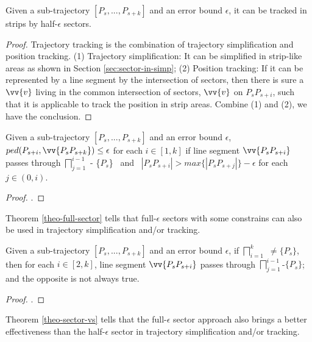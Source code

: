 \begin{theorem}
	\label{theo-half-sector}
	Given a sub-trajectory $[P_s,...,P_{s+k}]$ and an error bound $\epsilon$, it can be tracked in strips by half-$\epsilon$ sectors.
\end{theorem}

\begin{proof}
	Trajectory tracking is the combination of trajectory simplification and position tracking.
	(1) Trajectory simplification: It can be simplified in strip-like areas as shown in Section \ref{sec:sector-in-simp};
	(2) Position tracking: If it can be represented by a line segment by the intersection of sectors, then there is sure a $\vv{v}$ living in the common intersection of sectors, \eg $\vv{v}$ on $P_sP_{s+i}$, such that it is applicable to track the position in strip areas.
	Combine (1) and (2), we have the conclusion.
\end{proof}



\begin{theorem}
	\label{theo-full-sector}
	Given a sub-trajectory $[P_s,...,P_{s+k}]$ and an error bound $\epsilon$, $ped(P_{s+i}, \vv{P_sP_{s+k}})\le \epsilon$ for each $i \in [1,k]$ if line segment $\vv{P_sP_{s+i}}$ passes through $\bigsqcap_{j=1}^{i-1}$ - \{$P_s$\} ~and~ $|P_sP_{s+i}| > max\{|P_sP_{s+j}|\} - \epsilon$ for each $j \in (0, i)$.
\end{theorem}

\begin{proof}
	\todo.
\end{proof}

Theorem \ref{theo-full-sector} tells that full-$\epsilon$ sectors with some constrains can also be used in trajectory simplification and/or tracking. 

\begin{theorem}
	\label{theo-sector-vs}
	Given a sub-trajectory $[P_s,...,P_{s+k}]$ and an error bound $\epsilon$, if $\bigsqcap_{i=1}^{k}$ $\ne \{P_s\}$, then for each $i \in [2, k]$, line segment $\vv{P_sP_{s+i}}$ passes through $\bigsqcap_{j=1}^{i-1}$-$\{P_s\}$; and the opposite is not always true.
\end{theorem}

\begin{proof}
	\todo.
\end{proof}

Theorem \ref{theo-sector-vs} tells that the full-$\epsilon$ sector approach also brings a better effectiveness than the half-$\epsilon$ sector in trajectory simplification and/or tracking.


